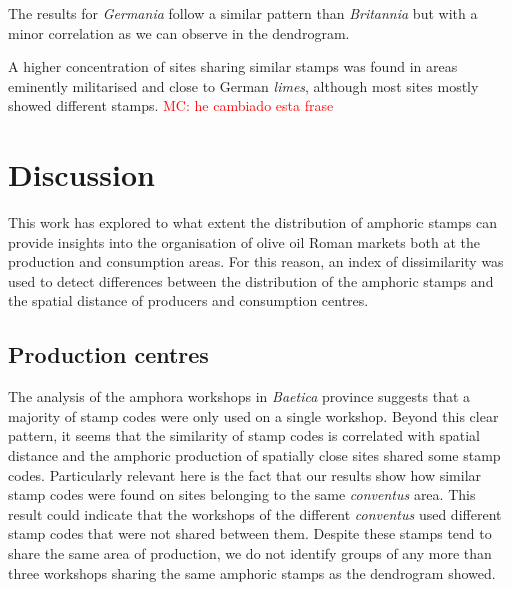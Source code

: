 \documentclass[review]{elsarticle}
\newcommand{\memo}[2]{\textcolor{#1}{#2}}
\newcommand{\maria}[1]{\memo{red}{MC: #1\\}}
\newcommand{\xavi}[1]{\memo{magenta}{XRC: #1\\}}
\begin{document}
The results for \textit{Germania} follow a similar pattern than \textit{Britannia} but with a minor correlation as we can observe in the dendrogram.

A higher concentration of sites sharing similar stamps was found in areas eminently militarised and close to German \textit{limes}, although most sites mostly showed different stamps. 
\maria{he cambiado esta frase}



\section{Discussion}

This work has explored to what extent the distribution of amphoric stamps can provide insights into the organisation of olive oil Roman markets both at the production and consumption areas. For this reason, an index of dissimilarity was used to detect differences between the distribution of the amphoric stamps and the spatial distance of producers and consumption centres. 


\subsection{Production centres}

The analysis of the amphora workshops in \textit{Baetica} province suggests that a majority of stamp codes were only used on a single workshop. Beyond this clear pattern, it seems that the similarity of stamp codes is correlated with spatial distance and the amphoric production of spatially close sites shared some stamp codes. Particularly relevant here is the fact that our results show how similar stamp codes were found on sites belonging to the same \textit{conventus} area. This result could indicate that the workshops of the different \textit{conventus} used different stamp codes that were not shared between them. Despite these stamps tend to share the same area of production, we do not identify groups of any more than three workshops sharing the same amphoric stamps as the dendrogram showed. 
\end{document}
